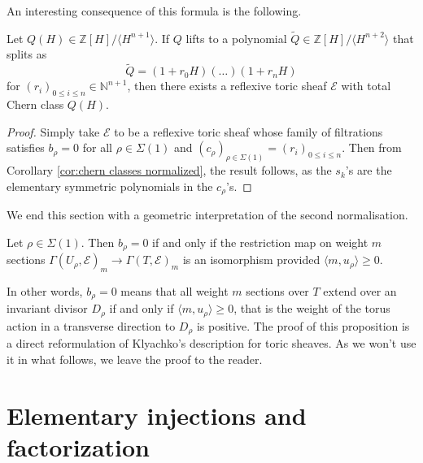 \documentclass[a4paper,10pt]{amsart}
\theoremstyle{plain}{
    \newtheorem{theorem}{Theorem}[section]
    \newtheorem{lemma}[theorem]{Lemma}
    \newtheorem{corollary}[theorem]{Corollary}
    \newtheorem{proposition}[theorem]{Proposition}
    \newtheorem{conjecture}[theorem]{Conjecture}
}
\theoremstyle{definition}{
    \newtheorem{definition}[theorem]{Definition}
    \newtheorem{defn-thm}[theorem]{Definition-Theorem}
    \newtheorem{example}[theorem]{Example}
    \newtheorem{notation}[theorem]{Notation}
}
\theoremstyle{remark}{
    \newtheorem{remark}[theorem]{Remark}
    \newtheorem{problem}[theorem]{Problem}
    \newtheorem{question}[theorem]{Question}
}
\def\cE{\mathcal{E}}
\def\Z{\mathbb{Z}}
\def\N{\mathbb{N}}
\begin{document}
An interesting consequence of this formula is the following.
\begin{proposition}
 \label{prop:prescribing chern classes}
 Let $Q(H)\in \Z[H]/\langle H^{n+1}\rangle$. If $Q$ lifts to a polynomial $\tilde Q\in \Z[H]/\langle H^{n+2}\rangle$ that splits as 
 $$\tilde Q=(1+r_0H)(\ldots)(1+r_nH)$$
 for $(r_i)_{0\leq i\leq n}\in \N^{n+1}$, then there exists a reflexive toric sheaf $\cE$ with total Chern class $Q(H)$.
\end{proposition}
\begin{proof}
 Simply take $\cE$ to be a reflexive toric sheaf whose family of filtrations satisfies $b_\rho=0$ for all $\rho\in\Sigma(1)$ and $(c_\rho)_{\rho\in\Sigma(1)}=(r_i)_{0\leq i \leq n}$. Then from Corollary \ref{cor:chern classes normalized}, the result follows, as the $s_k$'s are the elementary symmetric polynomials in the $c_\rho$'s.
\end{proof}


We end this section with a geometric interpretation of the second normalisation.
\begin{proposition}
 \label{prop:geometric interpretation normalisation}
 Let $\rho\in\Sigma(1)$. Then $b_\rho=0$ if and only if the restriction map on weight $m$ sections $\Gamma(U_\rho,\cE)_m\to\Gamma(T,\cE)_m$ is an isomorphism provided $\langle m,u_\rho \rangle \geq 0$.
\end{proposition}
In other words, $b_\rho=0$ means that all weight $m$ sections over $T$ extend over an invariant divisor $D_\rho$ if and only if $\langle m,u_\rho \rangle \geq 0$, that is the weight of the torus action in a transverse direction to $D_\rho$ is positive. The proof of this proposition is a direct reformulation of Klyachko's description for toric sheaves. As we won't use it in what follows, we leave the proof to the reader.




\section{Elementary injections and factorization}
\label{sec:torsion free case}
\end{document}
